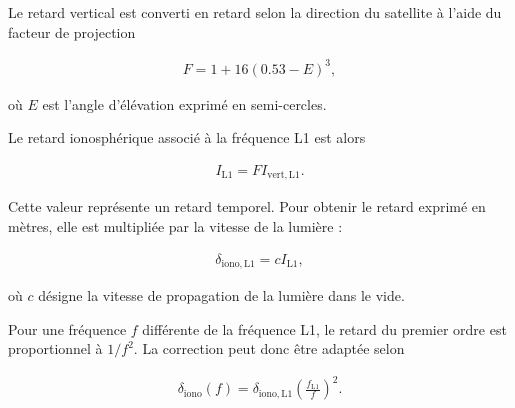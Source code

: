 Le retard vertical est converti en retard selon la direction du satellite
à l'aide du facteur de projection

\begin{align}
F
=
1+16(0.53-E)^3,
\label{eq:klobuchar_mapping}
\end{align}

où $E$ est l'angle d'élévation exprimé en semi-cercles.

Le retard ionosphérique associé à la fréquence L1 est alors

\begin{align}
I_{\mathrm{L1}}
=
F I_{\mathrm{vert,L1}}.
\label{eq:klobuchar_slant}
\end{align}

Cette valeur représente un retard temporel. Pour obtenir le retard
exprimé en mètres, elle est multipliée par la vitesse de la lumière :

\begin{align}
\delta_{\mathrm{iono,L1}}
=
c I_{\mathrm{L1}},
\label{eq:klobuchar_metre}
\end{align}

où $c$ désigne la vitesse de propagation de la lumière dans le vide.

Pour une fréquence $f$ différente de la fréquence L1, le retard du premier
ordre est proportionnel à $1/f^2$. La correction peut donc être adaptée
selon

\begin{align}
\delta_{\mathrm{iono}}(f)
=
\delta_{\mathrm{iono,L1}}
\left(
\frac{f_{\mathrm{L1}}}{f}
\right)^2.
\label{eq:klobuchar_frequency}
\end{align}


